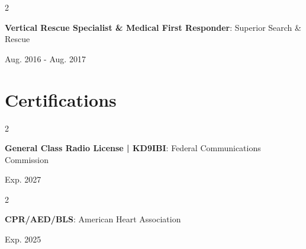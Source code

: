 \documentclass[10pt, letterpaper]{article}
\newenvironment{twocolentry}[2][]{
    \onecolentry
    \def\secondColumn{#2}
    \setcolumnwidth{\fill, 4.5 cm}
    \begin{paracol}{2}
}{
    \switchcolumn \raggedleft \secondColumn
    \end{paracol}
    \endonecolentry
} %
\begin{document}
        \begin{twocolentry}{
            Aug. 2016 - Aug. 2017
        }
            \textbf{Vertical Rescue Specialist \& Medical First Responder}: Superior Search \& Rescue 
        \end{twocolentry}

    \section{Certifications}
        \begin{twocolentry}{
            Exp. 2027
        }
            \textbf{General Class Radio License | KD9IBI}: Federal Communications Commission
        \end{twocolentry}

        \begin{twocolentry}{
            Exp. 2025
        }
            \textbf{CPR/AED/BLS}: American Heart Association
        \end{twocolentry}
\end{document}
